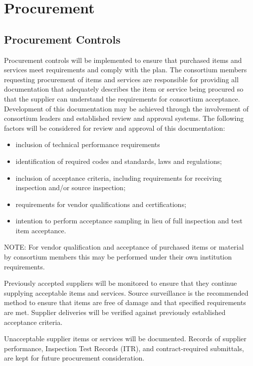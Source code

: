 \section{Procurement}

\subsection{Procurement Controls}

Procurement controls will be implemented to ensure that
purchased items and services meet  requirements and comply
with the   plan.  The consortium members
requesting procurement of items and services are responsible for
providing all documentation that adequately describes the item or
service being procured so that the supplier can understand the 
requirements for consortium acceptance. Development of this documentation
may be achieved through the involvement of consortium leaders and
established review and approval systems. The following factors will be
considered for review and approval of this documentation:
\begin{itemize}
 \item inclusion of technical performance requirements
 \item identification of required codes and standards, laws and
   regulations;
 \item inclusion of acceptance criteria, including requirements for
   receiving inspection and/or source inspection;
 \item {} requirements for vendor qualifications and
   certifications;
 \item {} intention to perform acceptance sampling in lieu
   of full inspection and test item acceptance.
\end{itemize}
NOTE: For vendor qualification and acceptance of purchased items or
material by consortium members this may be performed under their own
institution requirements.

Previously accepted suppliers will be monitored to ensure that they
continue supplying acceptable items and services. Source surveillance
is the recommended method to ensure that items are free of damage and
that specified requirements are met. Supplier deliveries will be
verified against previously established acceptance criteria.

Unacceptable supplier items or services will be documented. Records
of supplier performance, Inspection Test Records (ITR), and
contract-required submittals, are kept for future procurement
consideration.

